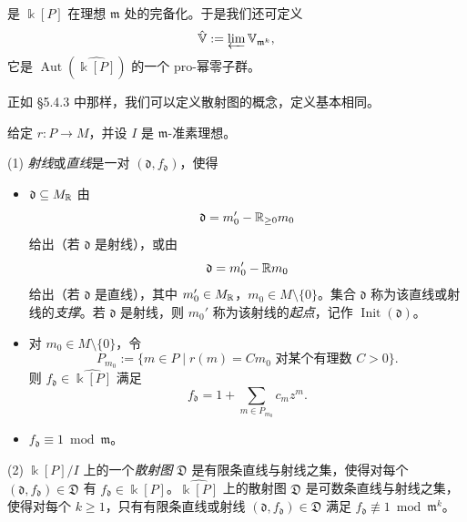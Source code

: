 
是 $\Bbbk[P]$ 在理想 $\mathfrak{m}$ 处的完备化。于是我们还可定义
\[
\hat{\mathbb{V}}:=\varprojlim\mathbb{V}_{\mathfrak{m}^k},
\]
它是 $\operatorname{Aut}(\widehat{\Bbbk[P]})$ 的一个 pro-幂零子群。

正如 §5.4.3 中那样，我们可以定义散射图的概念，定义基本相同。

\begin{definition}
给定 $r:P\to M$，并设 $I$ 是 $\mathfrak{m}$-准素理想。

(1) \emph{射线}或\emph{直线}是一对 $(\mathfrak{d},f_{\mathfrak{d}})$，使得
\begin{itemize}[leftmargin=1.6em]
\item $\mathfrak{d}\subseteq M_{\mathbb{R}}$ 由
\[
\mathfrak{d}=m_0'-\mathbb{R}_{\ge0}m_0
\]
给出（若 $\mathfrak{d}$ 是射线），或由
\[
\mathfrak{d}=m_0'-\mathbb{R} m_0
\]
给出（若 $\mathfrak{d}$ 是直线），其中 $m_0'\in M_{\mathbb{R}}$，$m_0\in M\setminus\{0\}$。集合 $\mathfrak{d}$ 称为该直线或射线的\emph{支撑}。若 $\mathfrak{d}$ 是射线，则 $m_0'$ 称为该射线的\emph{起点}，记作 $\operatorname{Init}(\mathfrak{d})$。
\item 对 $m_0\in M\setminus\{0\}$，令
\[
P_{m_0}:=\{m\in P\mid r(m)=Cm_0\text{ 对某个有理数 }C>0\}.
\]
则 $f_{\mathfrak{d}}\in\widehat{\Bbbk[P]}$ 满足
\[
f_{\mathfrak{d}}=1+\sum_{m\in P_{m_0}}c_mz^m.
\]
\item $f_{\mathfrak{d}}\equiv1\bmod\mathfrak{m}$。
\end{itemize}

(2) $\Bbbk[P]/I$ 上的一个\emph{散射图} $\mathfrak{D}$ 是有限条直线与射线之集，使得对每个 $(\mathfrak{d},f_{\mathfrak{d}})\in\mathfrak{D}$ 有 $f_{\mathfrak{d}}\in \Bbbk[P]$。$\widehat{\Bbbk[P]}$ 上的散射图 $\mathfrak{D}$ 是可数条直线与射线之集，使得对每个 $k\ge1$，只有有限条直线或射线 $(\mathfrak{d},f_{\mathfrak{d}})\in\mathfrak{D}$ 满足 $f_{\mathfrak{d}}\not\equiv1\bmod\mathfrak{m}^k$。
\end{definition}


